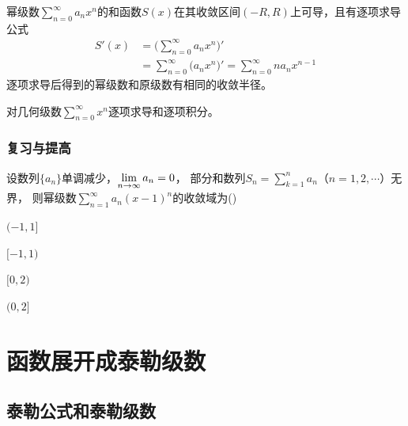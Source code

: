 \documentclass[14pt,notheorems,leqno,xcolor={rgb}]{beamer} %
\begin{document}
\begin{frame}
\begin{property}
幂级数$\sum\limits_{n=0}^{\infty}a_nx^n$的和函数$S(x)$在其收敛区间$(-R,R)$上可导，且有逐项求导公式
\begin{align*}
  S'(x) &=  \big(\sum_{n=0}^{\infty}a_nx^n)' \\
  &= \sum_{n=0}^{\infty}\big(a_nx^n)' = \sum\limits_{n=0}^{\infty}na_nx^{n-1}
\end{align*}
逐项求导后得到的幂级数和原级数有相同的收敛半径。
\end{property}
\end{frame}

\begin{frame}
\begin{example}
对几何级数$\sum\limits_{n=0}^{\infty}x^n$逐项求导和逐项积分。
\end{example}
\end{frame}


\begin{frame}
\frametitle{复习与提高}
\begin{choice}%
设数列$\{a_n\}$单调减少，$\lim\limits_{n\to\infty}a_n=0$，
部分和数列$S_n=\sum\limits_{k=1}^n a_n$（$n=1,2,\cdots$）无界，
则幂级数$\sum\limits_{n=1}^{\infty}a_n(x-1)^n$的收敛域为\dotfill()
\begin{choicehalf}
  \item $(-1,1]$  ~
  \item $[-1,1)$ ~
  \item $[0,2)$ ~
  \item $(0,2]$ ~
\end{choicehalf}
\end{choice}
\end{frame}

\section{函数展开成泰勒级数}

\subsection{泰勒公式和泰勒级数}
\end{document}
